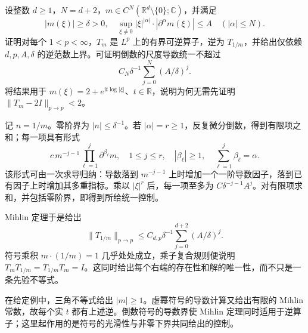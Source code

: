 \begin{exercise}\label{b2:ex:22-new-3}
设整数 \(d\geq1\)，\(N=d+2\)，\(m\in C^N(\mathbb R^d\setminus\{0\};\mathbb C)\)，并满足
\[
 |m(\xi)|\geq\delta>0,
 \quad
 \sup_{\xi\ne0}|\xi|^{|\alpha|}\cdot
           |\partial^\alpha m(\xi)|\leq A
 \quad(|\alpha|\leq N).
\]
证明对每个 \(1<p<\infty\)，\(T_m\) 是 \(L^p\) 上的有界可逆算子，逆为 \(T_{1/m}\)，并给出仅依赖 \(d,p,A,\delta\) 的逆范数上界。可证明倒数的尺度导数统一不超过
\[
 C_N\delta^{-1}\sum_{j=0}^N(A/\delta)^j.
\]
将结果用于 \(m(\xi)=2+e^{\mathrm it\log|\xi|}\)、\(t\in\mathbb R\)，说明为何无需先证明 \(\|T_m-2I\|_{p\to p}<2\)。
\end{exercise}
\begin{solution}
记 \(n=1/m\)。零阶界为 \(|n|\leq\delta^{-1}\)。若 \(|\alpha|=r\geq1\)，反复微分倒数，得到有限项之和；每一项具有形式
\[
 c\,m^{-j-1}\prod_{\ell=1}^j\partial^{\beta_\ell}m,
 \quad
 1\leq j\leq r,
 \quad |\beta_\ell|\geq1,
 \quad\sum_{\ell=1}^j\beta_\ell=\alpha.
\]
该形式可由一次求导归纳：导数落到 \(m^{-j-1}\) 上时增加一个一阶导数因子，落到已有因子上时增加其多重指标。乘以 \(|\xi|^r\) 后，每一项至多为 \(C\delta^{-j-1}A^j\)。对有限项求和，并包括零阶界，即得到所给统一控制。

Mihlin 定理于是给出
\[
 \|T_{1/m}\|_{p\to p}
 \leq C_{d,p}\delta^{-1}\sum_{j=0}^{d+2}(A/\delta)^j.
\]
符号乘积 \(m\cdot(1/m)=1\) 几乎处处成立，乘子复合规则便说明
\(T_mT_{1/m}=T_{1/m}T_m=I\)。这同时给出每个右端的存在性和解的唯一性，而不只是一条先验不等式。

在给定例中，三角不等式给出 \(|m|\geq1\)。虚幂符号的导数计算又给出有限的 Mihlin 常数，故每个实 \(t\) 都有上述逆。倒数符号的导数界使 Mihlin 定理同时适用于逆算子；这里起作用的是符号的光滑性与非零下界共同给出的控制。
\end{solution}

